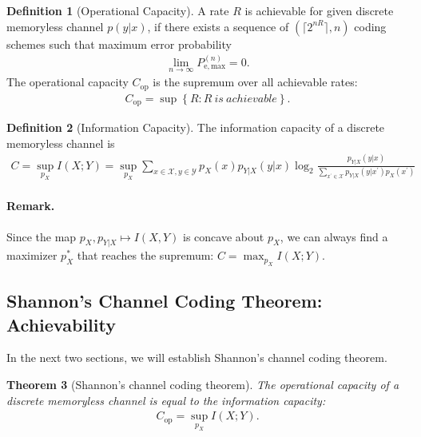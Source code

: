 \documentclass{article}
\numberwithin{equation}{section}
\renewcommand{\cal}{\mathcal}
\theoremstyle{plain}
\newtheorem{theorem}{Theorem}[section]
\theoremstyle{definition}
\newtheorem{definition}[theorem]{Definition}
\begin{document}
\begin{definition}[Operational Capacity]
A rate $R$ is achievable for given discrete memoryless channel $p(y|x)$, if there exists a sequence of $(\lceil 2^{nR}\rceil, n)$ coding schemes such that maximum error probability
\begin{align*}
	\lim_{n\to\infty}P_{\mathrm{e,max}}^{(n)}=0.
\end{align*}
The operational capacity $C_{\mathrm{op}}$ is the supremum over all achievable rates:
\begin{align*}
	C_{\mathrm{op}}=\sup\left\{R: R\ is\ achievable\right\}.
\end{align*}
\end{definition}

\begin{definition}[Information Capacity]
The information capacity of a discrete memoryless channel is
\begin{align*}
	C=\sup_{p_X}I(X;Y)=\sup_{p_X}\sum_{x\in\cal{X},y\in\cal{Y}}p_X(x)p_{Y|X}(y|x)\log_2\frac{p_{Y|X}(y|x)}{\sum_{x^\prime\in\cal{X}}p_{Y|X}(y|x^\prime)p_X(x^\prime)}
\end{align*}
\end{definition}
\paragraph{Remark.} Since the map $p_X,p_{Y|X}\mapsto I(X,Y)$ is concave about $p_X$, we can always find a maximizer $p_X^*$ that reaches the supremum: $C=\max_{p_X}I(X;Y)$.

\subsection{Shannon's Channel Coding Theorem: Achievability}
In the next two sections, we will establish Shannon's channel coding theorem.
\begin{theorem}[Shannon's channel coding theorem]\label{SCCT}
The operational capacity of a discrete memoryless channel is
equal to the information capacity:
\begin{align*}
	C_{\mathrm{op}}=\sup_{p_X}I(X;Y).
\end{align*}
\end{theorem}
\end{document}
